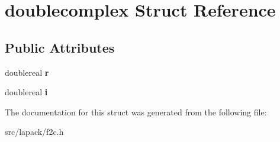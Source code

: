 \hypertarget{structdoublecomplex}{\section{doublecomplex \-Struct \-Reference}
\label{structdoublecomplex}
}
\subsection*{\-Public \-Attributes}
\begin{DoxyCompactItemize}
\item 
\hypertarget{structdoublecomplex_aa21d9095ea8af6f0530961e14e25d060}{doublereal {\bfseries r}}\label{structdoublecomplex_aa21d9095ea8af6f0530961e14e25d060}

\item 
\hypertarget{structdoublecomplex_a29ac0f1fc7a96e2344ef1464a80e2877}{doublereal {\bfseries i}}\label{structdoublecomplex_a29ac0f1fc7a96e2344ef1464a80e2877}

\end{DoxyCompactItemize}


\-The documentation for this struct was generated from the following file\-:\begin{DoxyCompactItemize}
\item 
src/lapack/f2c.\-h\end{DoxyCompactItemize}
